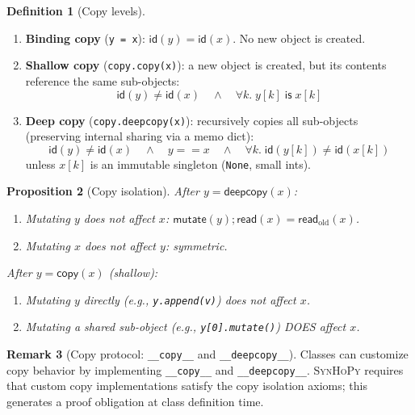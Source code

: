 \documentclass[11pt,a4paper]{report}
\theoremstyle{definition}
\newtheorem{definition}{Definition}[chapter]
\newtheorem{remark}[definition]{Remark}
\theoremstyle{plain}
\newtheorem{proposition}[definition]{Proposition}
\newcommand{\synhopy}{\textsc{SynHoPy}}
\begin{document}
\begin{definition}[Copy levels]
\begin{enumerate}
  \item \textbf{Binding copy} (\lstinline[style=python]{y = x}): $\mathsf{id}(y) = \mathsf{id}(x)$.
    No new object is created.
  \item \textbf{Shallow copy} (\lstinline[style=python]{copy.copy(x)}): a new object is created,
    but its contents reference the same sub-objects:
    \[
      \mathsf{id}(y) \neq \mathsf{id}(x) \quad\land\quad
      \forall k.\; y[k] \;\mathsf{is}\; x[k]
    \]
  \item \textbf{Deep copy} (\lstinline[style=python]{copy.deepcopy(x)}): recursively copies
    all sub-objects (preserving internal sharing via a memo dict):
    \[
      \mathsf{id}(y) \neq \mathsf{id}(x) \quad\land\quad
      y == x \quad\land\quad
      \forall k.\; \mathsf{id}(y[k]) \neq \mathsf{id}(x[k])
    \]
    unless $x[k]$ is an immutable singleton (\lstinline[style=python]{None}, small ints).
\end{enumerate}
\end{definition}

\begin{proposition}[Copy isolation]
After $y = \mathsf{deepcopy}(x)$:
\begin{enumerate}
  \item Mutating $y$ does not affect $x$: $\mathsf{mutate}(y); \mathsf{read}(x) = \mathsf{read}_{\mathrm{old}}(x)$.
  \item Mutating $x$ does not affect $y$: symmetric.
\end{enumerate}
After $y = \mathsf{copy}(x)$ (shallow):
\begin{enumerate}
  \item Mutating $y$ directly (e.g., \lstinline[style=python]{y.append(v)}) does not affect $x$.
  \item Mutating a shared sub-object (e.g., \lstinline[style=python]{y[0].mutate()}) DOES affect $x$.
\end{enumerate}
\end{proposition}

\begin{remark}[Copy protocol: \texttt{\_\_copy\_\_} and \texttt{\_\_deepcopy\_\_}]
Classes can customize copy behavior by implementing \lstinline[style=python]{__copy__}
and \lstinline[style=python]{__deepcopy__}.  \synhopy{} requires that custom
copy implementations satisfy the copy isolation axioms; this generates
a proof obligation at class definition time.
\end{remark}
\end{document}
